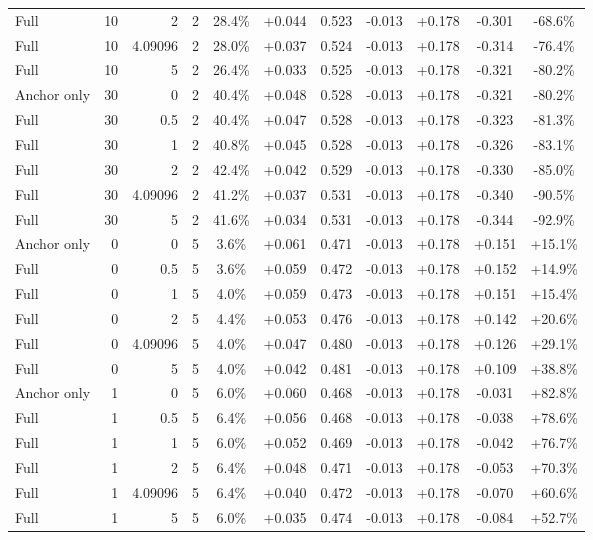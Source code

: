 \begin{table}[htbp]
\begin{tabular}{lrrrccccccc}
Full & 10 & 2 & 2 & 28.4\% & +0.044 & 0.523 & -0.013 & +0.178 & -0.301 & -68.6\% \\
Full & 10 & 4.09096 & 2 & 28.0\% & +0.037 & 0.524 & -0.013 & +0.178 & -0.314 & -76.4\% \\
Full & 10 & 5 & 2 & 26.4\% & +0.033 & 0.525 & -0.013 & +0.178 & -0.321 & -80.2\% \\
Anchor only & 30 & 0 & 2 & 40.4\% & +0.048 & 0.528 & -0.013 & +0.178 & -0.321 & -80.2\% \\
Full & 30 & 0.5 & 2 & 40.4\% & +0.047 & 0.528 & -0.013 & +0.178 & -0.323 & -81.3\% \\
Full & 30 & 1 & 2 & 40.8\% & +0.045 & 0.528 & -0.013 & +0.178 & -0.326 & -83.1\% \\
Full & 30 & 2 & 2 & 42.4\% & +0.042 & 0.529 & -0.013 & +0.178 & -0.330 & -85.0\% \\
Full & 30 & 4.09096 & 2 & 41.2\% & +0.037 & 0.531 & -0.013 & +0.178 & -0.340 & -90.5\% \\
Full & 30 & 5 & 2 & 41.6\% & +0.034 & 0.531 & -0.013 & +0.178 & -0.344 & -92.9\% \\
Anchor only & 0 & 0 & 5 & 3.6\% & +0.061 & 0.471 & -0.013 & +0.178 & +0.151 & +15.1\% \\
Full & 0 & 0.5 & 5 & 3.6\% & +0.059 & 0.472 & -0.013 & +0.178 & +0.152 & +14.9\% \\
Full & 0 & 1 & 5 & 4.0\% & +0.059 & 0.473 & -0.013 & +0.178 & +0.151 & +15.4\% \\
Full & 0 & 2 & 5 & 4.4\% & +0.053 & 0.476 & -0.013 & +0.178 & +0.142 & +20.6\% \\
Full & 0 & 4.09096 & 5 & 4.0\% & +0.047 & 0.480 & -0.013 & +0.178 & +0.126 & +29.1\% \\
Full & 0 & 5 & 5 & 4.0\% & +0.042 & 0.481 & -0.013 & +0.178 & +0.109 & +38.8\% \\
Anchor only & 1 & 0 & 5 & 6.0\% & +0.060 & 0.468 & -0.013 & +0.178 & -0.031 & +82.8\% \\
Full & 1 & 0.5 & 5 & 6.4\% & +0.056 & 0.468 & -0.013 & +0.178 & -0.038 & +78.6\% \\
Full & 1 & 1 & 5 & 6.0\% & +0.052 & 0.469 & -0.013 & +0.178 & -0.042 & +76.7\% \\
Full & 1 & 2 & 5 & 6.4\% & +0.048 & 0.471 & -0.013 & +0.178 & -0.053 & +70.3\% \\
Full & 1 & 4.09096 & 5 & 6.4\% & +0.040 & 0.472 & -0.013 & +0.178 & -0.070 & +60.6\% \\
Full & 1 & 5 & 5 & 6.0\% & +0.035 & 0.474 & -0.013 & +0.178 & -0.084 & +52.7\% \\

\end{tabular}
\end{table}

